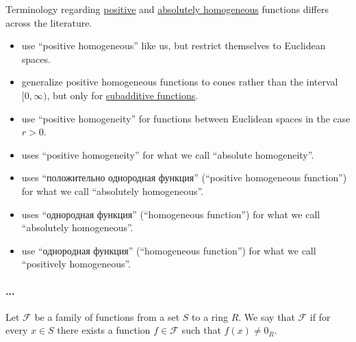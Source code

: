 \begin{remark}\label{rem:positive_homogeneous_function}
  Terminology regarding \hyperref[def:real_homogeneous_function/positive]{positive} and \hyperref[def:real_homogeneous_function/absolute]{absolutely homogeneous} functions differs across the literature.
  \begin{itemize}
    \item {} use \enquote{positive homogeneous} like us, but restrict themselves to Euclidean spaces.

    \item {} generalize positive homogeneous functions to cones rather than the interval \( [0, \infty) \), but only for \hyperref[def:additive_function/sub]{subadditive functions}.

    \item {} use \enquote{positive homogeneity} for functions between Euclidean spaces in the case \( r > 0 \).

    \item {} uses \enquote{positive homogeneity} for what we call \enquote{absolute homogeneity}.

    \item {} uses \enquote{положительно однородная функция} (\enquote{positive homogeneous function}) for what we call \enquote{absolutely homogeneous}.

    \item {} uses \enquote{однородная функция} (\enquote{homogeneous function}) for what we call \enquote{absolutely homogeneous}.

    \item {} use \enquote{однородная функция} (\enquote{homogeneous function}) for what we call \enquote{positively homogeneous}.
  \end{itemize}
\end{remark}

\paragraph{...}

\begin{definition}\label{def:functions_vanish_nowhere}
  Let \( \mathcal{F} \) be a family of functions from a set \( S \) to a ring \( R \). We say that \( \mathcal{F} \)  if for every \( x \in S \) there exists a function \( f \in \mathcal{F} \) such that \( f(x) \neq 0_R \).
\end{definition}

